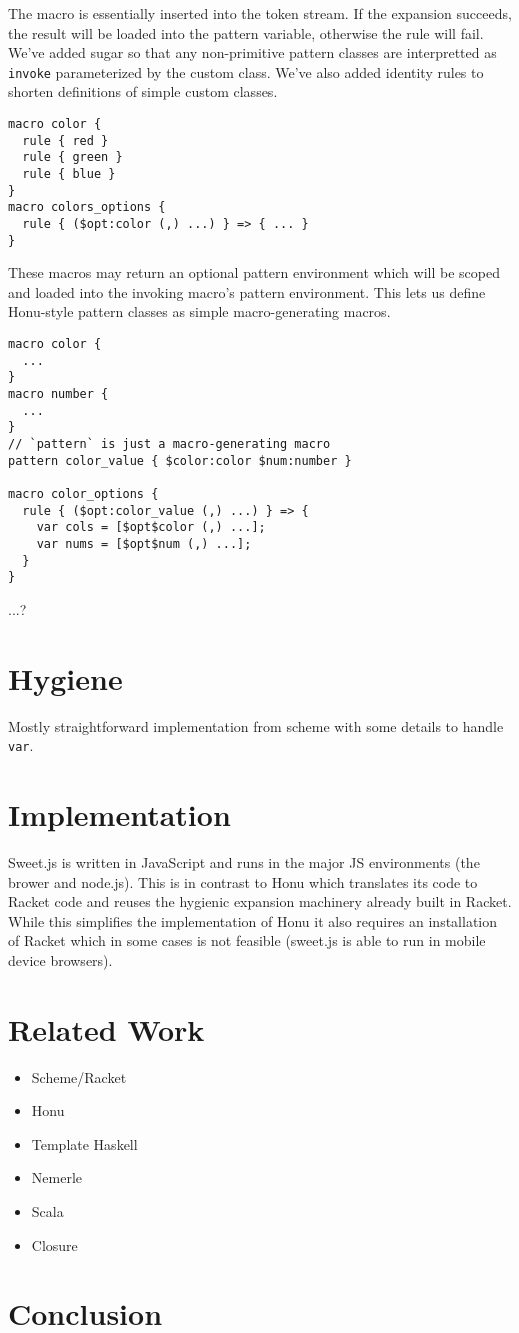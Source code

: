 \documentclass[preprint,10pt]{sigplanconf}
\begin{document}
The macro is essentially inserted into the token stream. If the
expansion succeeds, the result will be loaded into the pattern
variable, otherwise the rule will fail. We've added sugar so that any
non-primitive pattern classes are interpretted as \verb!invoke!
parameterized by the custom class. We've also added identity rules to
shorten definitions of simple custom classes.

\begin{verbatim}
macro color {
  rule { red }
  rule { green }
  rule { blue }
}
macro colors_options {
  rule { ($opt:color (,) ...) } => { ... }
}
\end{verbatim}

These macros may return an optional pattern environment which will be
scoped and loaded into the invoking macro's pattern environment. This
lets us define Honu-style pattern classes as simple macro-generating
macros.

\begin{verbatim}
macro color {
  ...
}
macro number {
  ...
}
// `pattern` is just a macro-generating macro
pattern color_value { $color:color $num:number }

macro color_options {
  rule { ($opt:color_value (,) ...) } => {
    var cols = [$opt$color (,) ...];
    var nums = [$opt$num (,) ...];
  }
}

\end{verbatim}

...?

\section{Hygiene}
\label{sec-5}

Mostly straightforward implementation from scheme with some details to
handle \texttt{var}.
\section{Implementation}
\label{sec-6}
Sweet.js is written in JavaScript and runs in the major JS
environments (\ie the brower and node.js). This is in contrast to Honu
which translates its code to Racket code and reuses the hygienic
expansion machinery already built in Racket. While this simplifies
the implementation of Honu it also requires an installation of Racket
which in some cases is not feasible (\eg sweet.js is able to run in
mobile device browsers).
\section{Related Work}
\label{sec-7}

\begin{itemize}
\item Scheme/Racket
\item Honu
\item Template Haskell
\item Nemerle
\item Scala
\item Closure
\end{itemize}
\section{Conclusion}
\label{sec-8}
\end{document}
